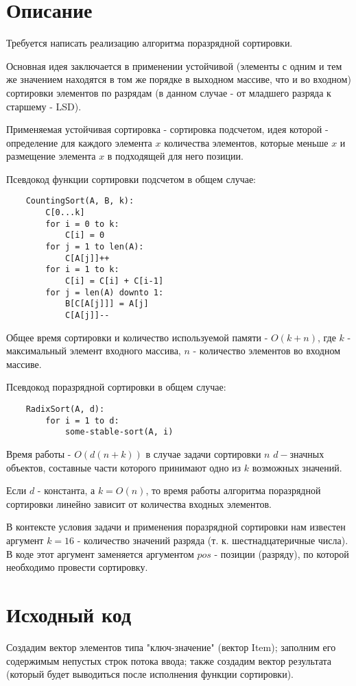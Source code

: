 \section{Описание}
Требуется написать реализацию алгоритма поразрядной сортировки.

Основная идея заключается в применении устойчивой (элементы с одним и тем же значением находятся в том же порядке в выходном массиве, что и во входном) сортировки элементов по разрядам (в данном случае - от младшего разряда к старшему - LSD).

Применяемая устойчивая сортировка - сортировка подсчетом, идея которой - определение для каждого элемента $x$ количества элементов, которые меньше $x$ и размещение элемента $x$ в подходящей для него позиции.

Псевдокод функции сортировки подсчетом в общем случае:
\begin{lstlisting}
	CountingSort(A, B, k):
		C[0...k]
		for i = 0 to k:
			C[i] = 0
		for j = 1 to len(A):
			C[A[j]]++
		for i = 1 to k:
			C[i] = C[i] + C[i-1]
		for j = len(A) downto 1:
			B[C[A[j]]] = A[j]
			C[A[j]]--
\end{lstlisting}

Общее время сортировки и количество используемой памяти - $O(k + n)$, где $k$ - максимальный элемент входного массива, $n$ - количество элементов во входном массиве.

Псевдокод поразрядной сортировки в общем случае:
\begin{lstlisting}
	RadixSort(A, d):
		for i = 1 to d:
			some-stable-sort(A, i)
\end{lstlisting}

Время работы - $O(d(n + k))$ в случае задачи сортировки $n$ $d-$значных объектов, составные части которого принимают одно из $k$ возможных значений.

Если $d$ - константа, а $k = O(n)$, то время работы алгоритма поразрядной сортировки линейно зависит от количества входных элементов. 

В контексте условия задачи и применения поразрядной сортировки нам известен аргумент $k = 16$ - количество значений разряда (т. к. шестнадцатеричные числа). В коде этот аргумент заменяется аргументом $pos$ - позиции (разряду), по которой необходимо провести сортировку.

\pagebreak

\section{Исходный код}
Создадим вектор элементов типа "ключ-значение" (вектор Item); заполним его содержимым непустых строк потока ввода; также создадим вектор результата (который будет выводиться после исполнения функции сортировки). 

